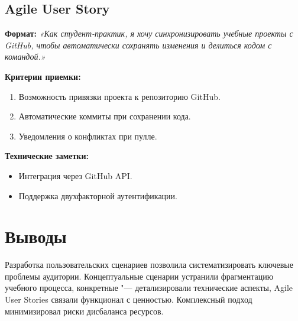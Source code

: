 \documentclass{bsuir}
\begin{document}
\subsection*{Agile User Story}

\textbf{Формат:}
\textit{«Как студент-практик, я хочу синхронизировать учебные проекты с GitHub, чтобы автоматически сохранять изменения и делиться кодом с командой.»}

\textbf{Критерии приемки:}

\begin{enumerate}
    \item Возможность привязки проекта к репозиторию GitHub.
    \item Автоматические коммиты при сохранении кода.
    \item Уведомления о конфликтах при пулле.
\end{enumerate}

\textbf{Технические заметки:}

\begin{itemize}
    \item Интеграция через GitHub API.
    \item Поддержка двухфакторной аутентификации.
\end{itemize}

\section{Выводы}

Разработка пользовательских сценариев позволила систематизировать ключевые
проблемы аудитории. Концептуальные сценарии устранили фрагментацию учебного
процесса, конкретные "--- детализировали технические аспекты, Agile User Stories
связали функционал с ценностью. Комплексный подход минимизировал риски
дисбаланса ресурсов.
\end{document}
